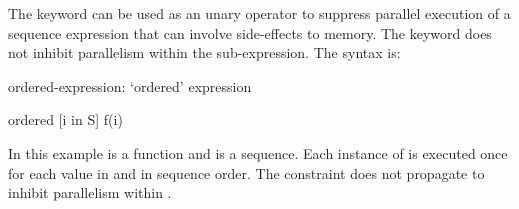 The  keyword can be used as an unary operator to
suppress parallel execution of a sequence expression that can involve
side-effects to memory. The  keyword does not inhibit
parallelism within the sub-expression. The syntax is:
\begin{syntax}
ordered-expression:
   `ordered' expression
\end{syntax}

\begin{example}
\begin{chapel}
ordered [i in S] f(i) 
\end{chapel}
In this example  is a function and  is a
sequence. Each instance of  is executed once for each value
in  and in sequence order. The  constraint does
not propagate to inhibit parallelism within .
\end{example}

